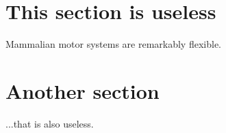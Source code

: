 \documentclass[a4paper]{article}
\begin{document}
\maketitle
\tableofcontents

\section{This section is useless}

Mammalian motor systems are remarkably flexible.

\section{Another section}

...that is also useless.

% 
% 

\end{document}
